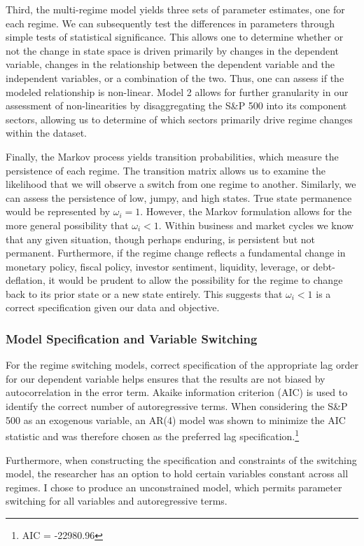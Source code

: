 \documentclass[11pt,a4paper,oldfontcommands]{memoir}
\begin{document}
{Third, the multi-regime model yields three sets of parameter estimates, one for each regime. We can subsequently test the differences in parameters through simple tests of statistical significance. This allows one to determine whether or not the change in state space is driven primarily by changes in the dependent variable, changes in the relationship between the dependent variable and the independent variables, or a combination of the two. Thus, one can assess if the modeled relationship is non-linear. Model 2 allows for further granularity in our assessment of non-linearities by disaggregating the S\&P 500 into its component sectors, allowing us to determine of which sectors primarily drive regime changes within the dataset. 

Finally, the Markov process yields transition probabilities, which measure the persistence of each regime. The transition matrix allows us to examine the likelihood that we will observe a switch from one regime to another. Similarly, we can assess the persistence of low, jumpy, and high states. True state permanence would be represented by $\omega_{i} = 1$. However, the Markov formulation allows for the more general possibility that $\omega_{i} < 1$. Within business and market cycles we know that any given situation, though perhaps enduring, is persistent but not permanent. Furthermore, if the regime change reflects a fundamental change in monetary policy, fiscal policy, investor sentiment, liquidity, leverage, or debt-deflation, it would be prudent to allow the possibility for the regime to change back to its prior state or a new state entirely. This suggests that $\omega_{i} < 1$ is a correct specification given our data and objective. 

\subsubsection{Model Specification and Variable Switching}

For the regime switching models, correct specification of the appropriate lag order for our dependent variable helps ensures that the results are not biased by autocorrelation in the error term. Akaike information criterion (AIC) is used to identify the correct number of autoregressive terms. When considering the S\&P 500 as an exogenous variable, an AR(4) model was shown to minimize the AIC statistic and was therefore chosen as the preferred lag specification.\footnote{AIC = -22980.96} 

Furthermore, when constructing the specification and constraints of the switching model, the researcher has an option to hold certain variables constant across all regimes. I chose to produce an unconstrained model, which permits parameter switching for all variables and autoregressive terms.

}
\end{document}
